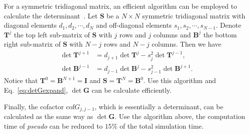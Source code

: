 For a symmetric tridiagonal matrix, an efficient algorithm can be employed to calculate the determinant~\cite{Pasquali2002}. Let $\mathbf{S}$ be a $N\times N$ symmetric tridiagonal matrix with diagonal elements $d_1, d_2, \cdots, d_N$ and off-diagonal elements $s_1,s_2, \cdots, s_{N-1}$. Denote $\mathbf{T}^j$ the top left sub-matrix of $\mathbf{S}$ with $j$ rows and $j$ columns and $\mathbf{B}^j$ the bottom right sub-matrix of $\mathbf{S}$ with $N-j$ rows and $N-j$ columns. Then we have
\begin{subequations}
    \begin{align}
        \det \mathbf{T}^{j+1} & = d_{j+1} \det \mathbf{T}^j - s_{j}^2 \det \mathbf{T}^{j-1},\\
        \det \mathbf{B}^{j-1} & = d_{j-1} \det \mathbf{B}^j - s_{j-1}^2 \det \mathbf{B}^{j+1}.
    \end{align}
\end{subequations}
Notice that $\mathbf{T}^0 = \mathbf{B}^{N+1} = \mathbf{I}$ and $\mathbf{S} = \mathbf{T}^N = \mathbf{B}^0$. Use this algorithm and Eq.~\eqref{eq:detGexpand}, $\det\mathbf{G}$ can be calculate efficiently. 

Finally, the cofactor $\text{cof} G_{j,j-1}$, which is essentially a determinant, can be calculated as the same way as $\det\mathbf{G}$.
Use the algorithm above, the computation time of \emph{pseudo} can be reduced to $15\%$ of the total simulation time.
